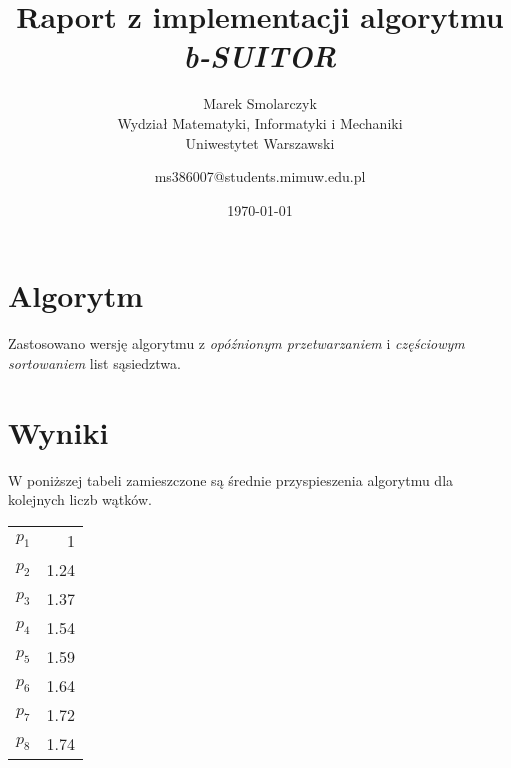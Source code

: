 \documentclass[12pt]{article}
\title{Raport z implementacji algorytmu \textit{b-SUITOR}}
\author{
        Marek Smolarczyk \\
                Wydział Matematyki, Informatyki i Mechaniki \\
                Uniwestytet Warszawski \\
            \and
        ms386007@students.mimuw.edu.pl
}
\date{\today}
\begin{document}
\maketitle

\section{Algorytm}\label{algorytm}
Zastosowano wersję algorytmu z \textit{opóźnionym przetwarzaniem} i \textit{częściowym sortowaniem}
list sąsiedztwa.

\section{Wyniki}\label{wyniki}
W poniższej tabeli zamieszczone są średnie przyspieszenia algorytmu dla kolejnych liczb wątków.
\\
\begin{center}
\begin{tabular}{ | l | r | }
        \hline
        $p_1$ & 1 \\
        $p_2$ & 1.24 \\
        $p_3$ & 1.37 \\
        $p_4$ & 1.54 \\
        $p_5$ & 1.59 \\
        $p_6$ & 1.64 \\
        $p_7$ & 1.72 \\
        $p_8$ & 1.74 \\
        \hline
\end{tabular}
\end{center}



\end{document}
